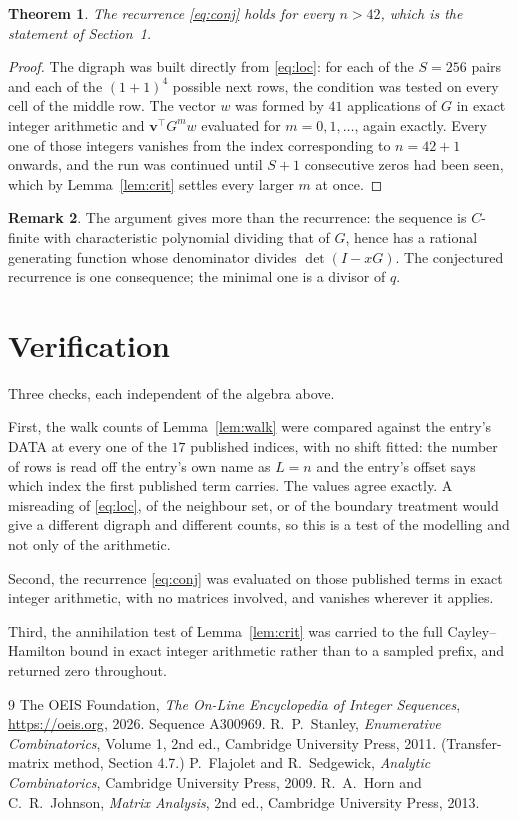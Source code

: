 \documentclass[11pt,a4paper]{article}
\theoremstyle{plain}
\newtheorem{theorem}{Theorem}
\theoremstyle{definition}
\newtheorem{remark}[theorem]{Remark}
\begin{document}
\begin{theorem}
The recurrence \eqref{eq:conj} holds for every $n>42$, which is the statement of
Section~1.
\end{theorem}

\begin{proof}
The digraph was built directly from \eqref{eq:loc}: for each of the $S=256$ pairs and each
of the $(1+1)^{4}$ possible next rows, the condition was tested on every cell of
the middle row. The vector $w$ was formed by $41$ applications of $G$ in exact integer
arithmetic and $\mathbf{v}^{\!\top}G^{m}w$ evaluated for $m=0,1,\dots$, again exactly.
Every one of those integers vanishes from the index corresponding to $n=42+1$ onwards,
and the run was continued until $S+1$ consecutive zeros had been seen, which by
Lemma~\ref{lem:crit} settles every larger $m$ at once.
\end{proof}

\begin{remark}
The argument gives more than the recurrence: the sequence is $C$-finite with characteristic
polynomial dividing that of $G$, hence has a rational generating function whose denominator
divides $\det(I-xG)$. The conjectured recurrence is one consequence; the minimal one is a
divisor of $q$.
\end{remark}

\section{Verification}

Three checks, each independent of the algebra above.

First, the walk counts of Lemma~\ref{lem:walk} were compared against the entry's DATA at
every one of the $17$ published indices, with no shift fitted: the number of rows is
read off the entry's own name as $L=n$ and the entry's offset says which index the first
published term carries. The values agree exactly. A misreading of \eqref{eq:loc}, of the
neighbour set, or of the boundary treatment would give a different digraph and different
counts, so this is a test of the modelling and not only of the arithmetic.

Second, the recurrence \eqref{eq:conj} was evaluated on those published terms in exact
integer arithmetic, with no matrices involved, and vanishes wherever it applies.

Third, the annihilation test of Lemma~\ref{lem:crit} was carried to the full
Cayley--Hamilton bound in exact integer arithmetic rather than to a sampled prefix, and
returned zero throughout.

\begin{thebibliography}{9}
 The OEIS Foundation, \emph{The On-Line Encyclopedia of Integer
Sequences}, \url{https://oeis.org}, 2026. Sequence A300969.
 R.~P.~Stanley, \emph{Enumerative Combinatorics}, Volume 1, 2nd ed.,
Cambridge University Press, 2011. (Transfer-matrix method, Section 4.7.)
 P.~Flajolet and R.~Sedgewick, \emph{Analytic Combinatorics}, Cambridge
University Press, 2009.
 R.~A.~Horn and C.~R.~Johnson, \emph{Matrix Analysis}, 2nd ed., Cambridge
University Press, 2013.
\end{thebibliography}
\end{document}
